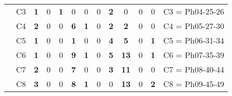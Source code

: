 \begin{table}[H]
{\begin{tabular}{|ccrrrrrrrrrrc|}
\multicolumn{1}{|c|}{}                                      & \multicolumn{1}{c|}{C3} & \multicolumn{1}{c|}{\textbf{1}}  & \multicolumn{1}{c|}{0}  & \multicolumn{1}{c|}{\textbf{1}}  & \multicolumn{1}{c|}{0}  & \multicolumn{1}{c|}{0}  & \multicolumn{1}{c|}{0}  & \multicolumn{1}{c|}{\textbf{2}}  & \multicolumn{1}{c|}{0}  & \multicolumn{1}{c|}{0}  & \multicolumn{1}{c|}{0}  & C3 = Ph04-25-26   \\ \cline{2-13}
\multicolumn{1}{|c|}{}                                      & \multicolumn{1}{c|}{C4} & \multicolumn{1}{c|}{\textbf{2}}  & \multicolumn{1}{c|}{0}  & \multicolumn{1}{c|}{0}  & \multicolumn{1}{c|}{\textbf{6}}  & \multicolumn{1}{c|}{\textbf{1}}  & \multicolumn{1}{c|}{0}  & \multicolumn{1}{c|}{\textbf{2}}  & \multicolumn{1}{c|}{\textbf{2}}  & \multicolumn{1}{c|}{0}  & \multicolumn{1}{c|}{0}  & C4 = Ph05-27-30   \\ \cline{2-13}
\multicolumn{1}{|c|}{}                                      & \multicolumn{1}{c|}{C5} & \multicolumn{1}{c|}{\textbf{1}}  & \multicolumn{1}{c|}{0}  & \multicolumn{1}{c|}{0}  & \multicolumn{1}{c|}{\textbf{1}}  & \multicolumn{1}{c|}{0}  & \multicolumn{1}{c|}{0}  & \multicolumn{1}{c|}{\textbf{4}}  & \multicolumn{1}{c|}{\textbf{5}}  & \multicolumn{1}{c|}{0}  & \multicolumn{1}{c|}{\textbf{1}}  & C5 = Ph06-31-34   \\ \cline{2-13}
\multicolumn{1}{|c|}{}                                      & \multicolumn{1}{c|}{C6} & \multicolumn{1}{c|}{\textbf{1}}  & \multicolumn{1}{c|}{0}  & \multicolumn{1}{c|}{0}  & \multicolumn{1}{c|}{\textbf{9}}  & \multicolumn{1}{c|}{\textbf{1}}  & \multicolumn{1}{c|}{0}  & \multicolumn{1}{c|}{\textbf{5}}  & \multicolumn{1}{c|}{\textbf{13}} & \multicolumn{1}{c|}{0}  & \multicolumn{1}{c|}{\textbf{1}}  & C6 = Ph07-35-39   \\ \cline{2-13}
\multicolumn{1}{|c|}{}                                      & \multicolumn{1}{c|}{C7} & \multicolumn{1}{c|}{\textbf{2}}  & \multicolumn{1}{c|}{0}  & \multicolumn{1}{c|}{0}  & \multicolumn{1}{c|}{\textbf{7}}  & \multicolumn{1}{c|}{0}  & \multicolumn{1}{c|}{0}  & \multicolumn{1}{c|}{\textbf{3}}  & \multicolumn{1}{c|}{\textbf{11}} & \multicolumn{1}{c|}{0}  & \multicolumn{1}{c|}{0}  & C7 = Ph08-40-44   \\ \cline{2-13}
\multicolumn{1}{|c|}{}                                      & \multicolumn{1}{c|}{C8} & \multicolumn{1}{c|}{\textbf{3}}  & \multicolumn{1}{c|}{0}  & \multicolumn{1}{c|}{0}  & \multicolumn{1}{c|}{\textbf{8}}  & \multicolumn{1}{c|}{\textbf{1}}  & \multicolumn{1}{c|}{0}  & \multicolumn{1}{c|}{0}  & \multicolumn{1}{c|}{\textbf{13}} & \multicolumn{1}{c|}{0}  & \multicolumn{1}{c|}{\textbf{2}}  & C8 = Ph09-45-49   \\ \cline{2-13}

\end{tabular}}
\end{table}
